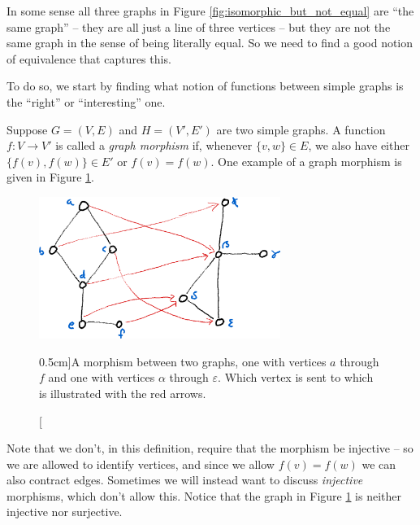 \documentclass[nobib]{tufte-handout}
\begin{document}
In some sense all three graphs in Figure \ref{fig:isomorphic_but_not_equal} are ``the same graph'' -- they are all just a line of three vertices -- but they are not the same graph in the sense of being literally equal. So we need to find a good notion of equivalence that captures this.

To do so, we start by finding what notion of functions between simple graphs is the ``right'' or ``interesting'' one.

\begin{definition}
  Suppose $G = (V, E)$ and $H = (V', E')$ are two simple graphs. A function $f: V \to V'$ is called a \emph{graph morphism} if, whenever $\{v, w\} \in E$, we also have either $\{f(v), f(w)\} \in E'$ or $f(v) = f(w)$. One example of a graph morphism is given in Figure \ref{fig:graph_morphism}. 
\end{definition}

\begin{figure}
  \centering
  \includegraphics[width=0.7\textwidth]{graphics/L2_eulerianity_subgraphs/graph_morphism.png}
  \caption[][0.5cm]{A morphism between two graphs, one with vertices $a$ through $f$ and one with vertices $\alpha$ through $\varepsilon$. Which vertex is sent to which is illustrated with the red arrows.}
  \label{fig:graph_morphism}
\end{figure}

Note that we don't, in this definition, require that the morphism be injective -- so we are allowed to identify vertices, and since we allow $f(v) = f(w)$ we can also contract edges. Sometimes we will instead want to discuss \emph{injective} morphisms, which don't allow this. Notice that the graph in Figure \ref{fig:graph_morphism} is neither injective nor surjective.
\end{document}
